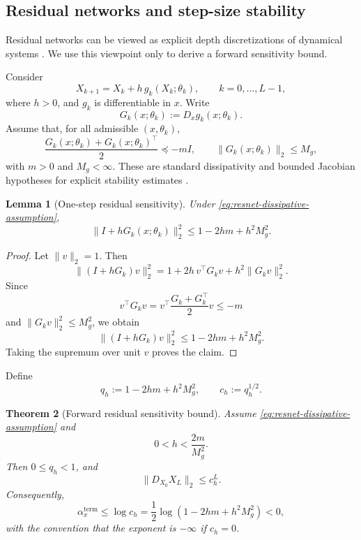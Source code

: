 \documentclass{article}
\newtheorem{theorem}{Theorem}[section]
\newtheorem{lemma}[theorem]{Lemma}
\numberwithin{equation}{section}
\begin{document}
\subsection{Residual networks and step-size stability}
\label{subsec:residual-laws}

Residual networks can be viewed as explicit depth discretizations of dynamical
systems \cite{He2016ResNet,HaberRuthotto2017,RuthottoHaber2020}. We use this
viewpoint only to derive a forward sensitivity bound.

Consider
\begin{equation}
\label{eq:resnet-layer}
X_{k+1}=X_k+h\,g_k(X_k;\theta_k),
\qquad
k=0,\ldots,L-1,
\end{equation}
where \(h>0\), and \(g_k\) is differentiable in \(x\). Write
\[
G_k(x;\theta_k):=D_xg_k(x;\theta_k).
\]
Assume that, for all admissible \((x,\theta_k)\),
\begin{equation}
\label{eq:resnet-dissipative-assumption}
\frac{G_k(x;\theta_k)+G_k(x;\theta_k)^\top}{2}
\preceq
-mI,
\qquad
\|G_k(x;\theta_k)\|_2\le M_g ,
\end{equation}
with \(m>0\) and \(M_g<\infty\). These are standard dissipativity and bounded
Jacobian hypotheses for explicit stability estimates \cite{Strikwerda2004,Khalil2002Nonlinear}.

\begin{lemma}[One-step residual sensitivity]
\label{lem:resnet-one-step}
Under \eqref{eq:resnet-dissipative-assumption},
\[
\|I+hG_k(x;\theta_k)\|_2^2
\le
1-2hm+h^2M_g^2 .
\]
\end{lemma}

\begin{proof}
Let \(\|v\|_2=1\). Then
\[
\|(I+hG_k)v\|_2^2
=
1+2h\,v^\top G_kv+h^2\|G_kv\|_2^2 .
\]
Since
\[
v^\top G_kv
=
v^\top\frac{G_k+G_k^\top}{2}v
\le
-m
\]
and \(\|G_kv\|_2^2\le M_g^2\), we obtain
\[
\|(I+hG_k)v\|_2^2
\le
1-2hm+h^2M_g^2 .
\]
Taking the supremum over unit \(v\) proves the claim.
\end{proof}

Define
\[
q_h:=1-2hm+h^2M_g^2,
\qquad
c_h:=q_h^{1/2}.
\]

\begin{theorem}[Forward residual sensitivity bound]
\label{thm:resnet-analytic-stability}
Assume \eqref{eq:resnet-dissipative-assumption} and
\[
0<h<\frac{2m}{M_g^2}.
\]
Then \(0\le q_h<1\), and
\[
\|D_{X_0}X_L\|_2\le c_h^L .
\]
Consequently,
\[
\alpha_x^{\mathrm{term}}
\le
\log c_h
=
\frac12\log(1-2hm+h^2M_g^2)
<0,
\]
with the convention that the exponent is \(-\infty\) if \(c_h=0\).
\end{theorem}
\end{document}
